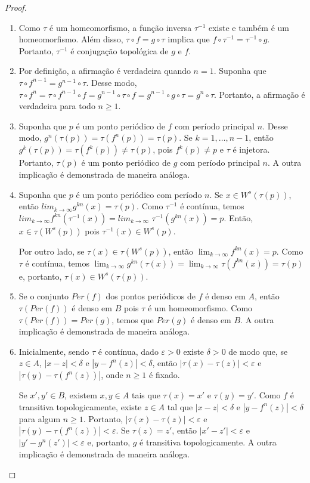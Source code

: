 \documentclass[a4paper, 12pt]{article}
\theoremstyle{definition}
\theoremstyle{plain}
\theoremstyle{plain}
\theoremstyle{plain}
\theoremstyle{remark}
\begin{document}
\begin{proof}
\begin{enumerate}
\item Como $\tau$ é um homeomorfismo, a função inversa $\tau^{-1}$ existe e também é um homeomorfismo. Além disso, $\tau \circ f = g \circ \tau$ implica que $f \circ \tau^{-1} = \tau^{-1} \circ g$. Portanto, $\tau^{-1}$ é conjugação topológica de $g$ e $f$.
\item Por definição, a afirmação é verdadeira quando $n = 1$. Suponha que $\tau \circ f^{n-1} = g^{n-1} \circ \tau$. Desse modo, $\tau \circ f^n = \tau \circ f^{n-1} \circ f = g^{n-1} \circ \tau \circ f = g^{n-1} \circ g \circ  \tau = g^n \circ \tau$. Portanto, a afirmação é verdadeira para todo $n \geq 1$.
\item Suponha que $p$ é um ponto periódico de $f$ com período principal $n$. Desse modo, $g^n(\tau(p)) = \tau(f^n(p)) = \tau(p)$. Se $k = 1, \dots, n-1$, então $g^k(\tau(p)) = \tau(f^k(p)) \neq \tau(p)$, pois $f^k(p) \neq p$ e $\tau$ é injetora. Portanto, $\tau(p)$ é um ponto periódico de $g$ com período principal $n$. A outra implicação é demonstrada de maneira análoga.
\item Suponha que $p$ é um ponto periódico com período $n$. Se $x \in W^s(\tau(p))$, então $lim_{k \rightarrow \infty} g^{kn}(x) = \tau(p)$. Como $\tau^{-1}$ é contínua, temos $lim_{k \rightarrow \infty} f^{kn}(\tau^{-1}(x)) = lim_{k \rightarrow \infty} $ $ \tau^{-1}(g^{kn}(x))= p$. Então,  $x \in \tau(W^s(p))$ pois $\tau^{-1}(x) \in W^s(p)$.

Por outro lado, se $\tau(x) \in \tau(W^s(p))$, então $\lim_{k \rightarrow \infty} f^{kn}(x) = p$. Como $\tau$ é contínua, temos $\lim_{k \rightarrow \infty} g^{kn}(\tau(x)) = \lim_{k \rightarrow \infty} \tau(f^{kn}(x)) = \tau(p)$ e, portanto, $\tau(x) \in W^s(\tau(p))$.
\item Se o conjunto $Per(f)$ dos pontos periódicos de $f$ é denso em $A$, então $\tau(Per(f))$ é denso em $B$ pois $\tau$ é um homeomorfismo. Como $\tau(Per(f)) = Per(g)$, temos que $Per(g)$ é denso em $B$. A outra implicação é demonstrada de maneira análoga.
\item Inicialmente, sendo $\tau$ é contínua, dado $\varepsilon > 0$ existe $\delta > 0$ de modo que, se $z \in A$, $|x - z| < \delta$ e $|y - f^n(z)| < \delta$, então $|\tau(x) - \tau(z)| < \varepsilon$ e $|\tau(y) - \tau(f^n(z))|$, onde $n \geq 1$ é fixado.

Se $x', y' \in B$, existem $x, y \in A$ tais que $\tau(x) = x'$ e $\tau(y) =  y'$. Como $f$ é transitiva topologicamente, existe $z \in A$ tal que $|x - z| < \delta$ e $|y - f^n(z)| < \delta$ para algum $n \geq 1$. Portanto, $|\tau(x) - \tau(z)| < \varepsilon$ e $|\tau(y) - \tau(f^n(z))| < \varepsilon$. Se $\tau(z) = z'$, então $|x' - z'| < \varepsilon$ e $|y' - g^n(z')| < \varepsilon$ e, portanto, $g$ é transitiva topologicamente. A outra implicação é demonstrada de maneira análoga.
\end{enumerate}
\end{proof}
\end{document}
